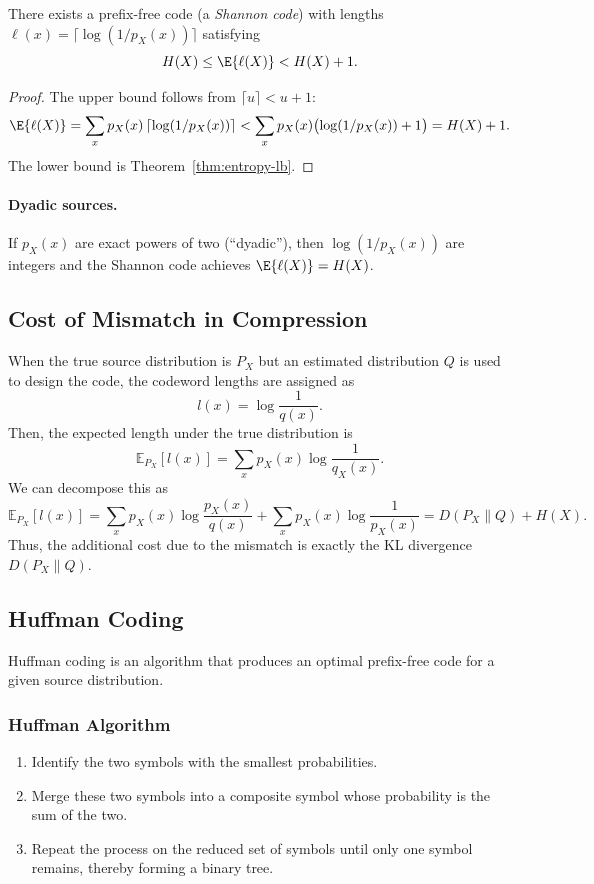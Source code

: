 \begin{theorem}
\label{thm:shannon-code}
There exists a prefix-free code (a \emph{Shannon code}) with lengths
\(\ell(x)=\lceil \log (1/p_X(x))\rceil\) satisfying
\begin{equation}
    H(X) \le \E{\ell(X)} < H(X)+1.
\end{equation}
\end{theorem}

\begin{proof}
The upper bound follows from $\lceil u\rceil<u+1$:
\[
\E{\ell(X)} = \sum_x p_X(x)\,\lceil \log(1/p_X(x))\rceil < \sum_x p_X(x)\bigl(\log(1/p_X(x))+1\bigr)=H(X)+1.
\]
The lower bound is Theorem~\ref{thm:entropy-lb}.
\end{proof}

\paragraph{Dyadic sources.}
If $p_X(x)$ are exact powers of two (``dyadic''), then $\log(1/p_X(x))$ are integers and the Shannon code achieves $\E{\ell(X)}=H(X)$.



\subsection{Cost of Mismatch in Compression}
When the true source distribution is $P_X$ but an estimated distribution $Q$ is used to design the code, the codeword lengths are assigned as
\[
l(x)=\log\frac{1}{q(x)}.
\]
Then, the expected length under the true distribution is
\[
\mathbb{E}_{P_X}[l(x)] = \sum_{x} p_X(x)\log\frac{1}{q_X(x)}.
\]
We can decompose this as
\[
\mathbb{E}_{P_X}[l(x)] = \sum_{x} p_X(x)\log\frac{p_X(x)}{q(x)} + \sum_{x} p_X(x)\log\frac{1}{p_X(x)} = D(P_X\|Q) + H(X).
\]
Thus, the additional cost due to the mismatch is exactly the KL divergence $D(P_X\|Q)$.


\subsection{Huffman Coding}
Huffman coding is an algorithm that produces an optimal prefix-free code for a given source distribution.

\subsubsection*{Huffman Algorithm}
\begin{enumerate}
    \item Identify the two symbols with the smallest probabilities.
    \item Merge these two symbols into a composite symbol whose probability is the sum of the two.
    \item Repeat the process on the reduced set of symbols until only one symbol remains, thereby forming a binary tree.
\end{enumerate}

